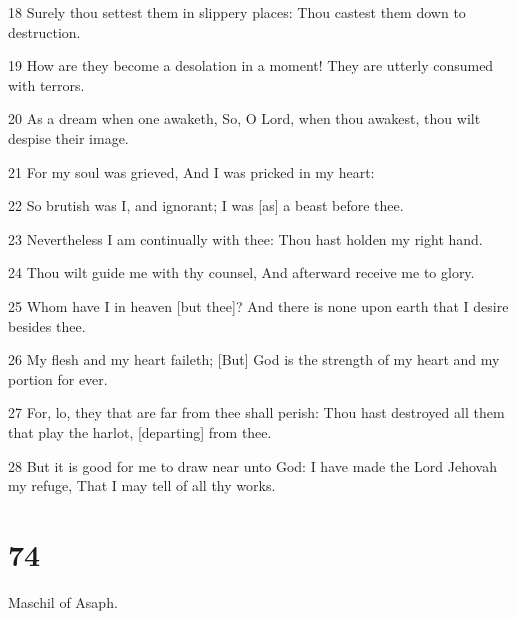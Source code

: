 \par 18 Surely thou settest them in slippery places: Thou castest them down to destruction.
\par 19 How are they become a desolation in a moment! They are utterly consumed with terrors.
\par 20 As a dream when one awaketh, So, O Lord, when thou awakest, thou wilt despise their image.
\par 21 For my soul was grieved, And I was pricked in my heart:
\par 22 So brutish was I, and ignorant; I was [as] a beast before thee.
\par 23 Nevertheless I am continually with thee: Thou hast holden my right hand.
\par 24 Thou wilt guide me with thy counsel, And afterward receive me to glory.
\par 25 Whom have I in heaven [but thee]? And there is none upon earth that I desire besides thee.
\par 26 My flesh and my heart faileth; [But] God is the strength of my heart and my portion for ever.
\par 27 For, lo, they that are far from thee shall perish: Thou hast destroyed all them that play the harlot, [departing] from thee.
\par 28 But it is good for me to draw near unto God: I have made the Lord Jehovah my refuge, That I may tell of all thy works.

\chapter{74}

\par Maschil of Asaph.

